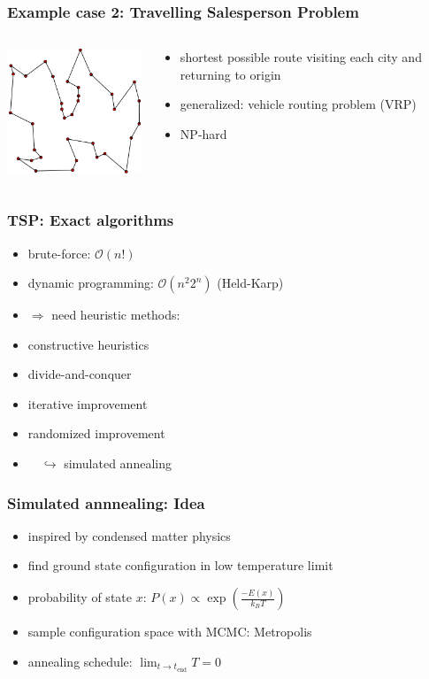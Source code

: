 \documentclass[aspectratio=43]{beamer}
\begin{document}
\begin{frame}
	\frametitle{Example case 2: \alert{T}ravelling \alert{S}alesperson \alert{P}roblem}
	\begin{columns}[T]
		\begin{column}{0.5\textwidth}
			\includegraphics[width=5cm]{tsp.png}\cite{Xypron}
		\end{column}
		\begin{column}{0.5\textwidth}
			\begin{itemize}
				\item shortest possible route visiting each city and returning to origin
				\item generalized: \alert{vehicle routing problem (VRP)}
				\item \alert{NP-hard}
			\end{itemize}
		\end{column}			
	\end{columns}
\end{frame}

\begin{frame}
	\frametitle{TSP: Exact algorithms}
	\begin{itemize}
		\item<1-3> brute-force: $\mathcal{O}(n!)$
		\item<1-3> dynamic programming: $\mathcal{O}(n^2 2^n)$ (Held-Karp) 
		\item<2-> \alert{$\Rightarrow$ need heuristic methods:}
		\item<3> constructive heuristics
		\item<3> divide-and-conquer
		\item<3> iterative improvement
		\item<3-> randomized improvement
		\item<4-> \alert{$\quad \hookrightarrow$ simulated annealing}
	\end{itemize}
\end{frame}

\begin{frame}
	\frametitle{Simulated annnealing: Idea}
	\begin{itemize}
		\item<1-> inspired by condensed matter physics
		\item<1-> find ground state configuration in low temperature limit
		\item<2-> probability of state $x$: \alert{$P(x)\propto \exp(\frac{-E(x)}{k_BT})$}
		\item<2-> sample configuration space with MCMC: \alert{Metropolis}
		\item<3-> \alert{annealing schedule}: $\lim_{t \rightarrow t_\text{end}} T = 0$
	\end{itemize}
\end{frame}
\end{document}
